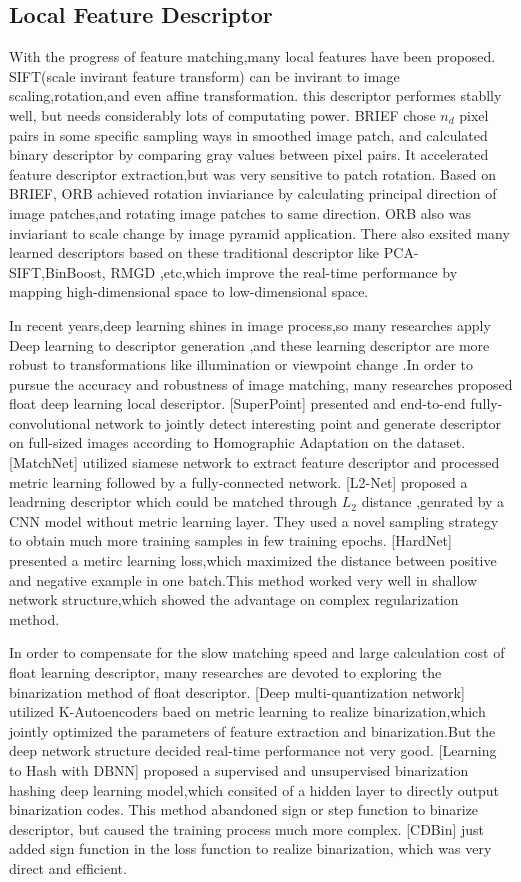 \documentclass[letterpaper, 10 pt, conference]{ieeeconf}  %
\begin{document}
\subsection{Local Feature Descriptor}
With the progress of feature matching,many local features have been proposed. SIFT(scale invirant feature transform) can be invirant to image scaling,rotation,and even affine transformation. this descriptor performes stablly well, but needs considerably lots of computating power. 
BRIEF chose $n_{d}$ pixel pairs in some specific sampling ways in smoothed image patch, and calculated binary descriptor by comparing gray values between pixel pairs. It accelerated feature descriptor extraction,but was very sensitive to patch rotation.  
Based on BRIEF, ORB achieved rotation inviariance by calculating principal direction of image patches,and rotating image patches to same direction. ORB also was inviariant to scale change by image pyramid application.
There also exsited many learned descriptors based on these traditional descriptor like PCA-SIFT,BinBoost, RMGD ,etc,which improve the real-time performance by mapping high-dimensional space to low-dimensional space. 

In recent years,deep learning shines in image process,so many researches apply Deep learning to descriptor generation ,and these learning descriptor are more robust to transformations like illumination or viewpoint change .In order to pursue the accuracy and robustness of image matching, many researches proposed float deep learning local descriptor.
[SuperPoint] presented and end-to-end fully-convolutional network to jointly detect interesting point and  generate descriptor on full-sized images according to Homographic Adaptation on the dataset.
[MatchNet] utilized  siamese network to extract feature descriptor and processed metric learning followed by a fully-connected network.
[L2-Net] proposed a leadrning descriptor which could be matched through $L_{2}$ distance ,genrated by a CNN model without metric learning layer. They used a novel sampling strategy to obtain much more training samples in few training epochs.
[HardNet] presented a metirc learning loss,which maximized the distance between positive and negative example in one batch.This method worked very well in shallow network structure,which showed the advantage on complex regularization method.

In order to compensate for the slow matching speed and large calculation cost of float learning descriptor, many researches are devoted to exploring the binarization method of float descriptor.
[Deep  multi-quantization network] utilized K-Autoencoders baed on metric learning to realize binarization,which jointly optimized the parameters of feature extraction and  binarization.But the deep network structure  decided  real-time performance not very good. 
[Learning to Hash  with DBNN] proposed a supervised and unsupervised binarization hashing deep learning model,which consited of a hidden layer to directly output binarization codes. This method abandoned sign or step function to binarize descriptor, but caused the training process much more complex. 
[CDBin] just added sign function in the loss function to realize binarization, which was very direct and efficient.
\end{document}
